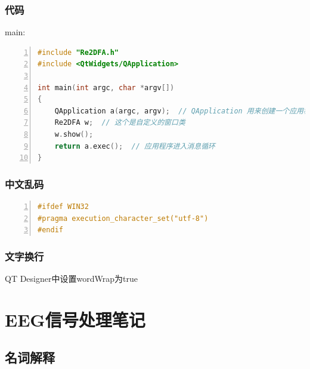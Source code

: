 \documentclass[cs4size,a4paper]{ctexart}
\numberwithin{equation}{section}
\numberwithin{table}{section}
\numberwithin{figure}{section}
\begin{document}

\subsubsection{代码}

main:

\begin{lstlisting}[language={c++},
    numbers=left,
    numberstyle=\tiny\monaco,
    basicstyle=\footnotesize\monaco]
#include "Re2DFA.h"
#include <QtWidgets/QApplication>

int main(int argc, char *argv[])
{
    QApplication a(argc, argv);  // QApplication 用来创建一个应用程序类，必须要有，且只能有一个
    Re2DFA w;  // 这个是自定义的窗口类
    w.show();
    return a.exec();  // 应用程序进入消息循环
}
\end{lstlisting}

\subsubsection{中文乱码}

\begin{lstlisting}[language={c++},
    numbers=left,
    numberstyle=\tiny\monaco,
    basicstyle=\footnotesize\monaco]
#ifdef WIN32  
#pragma execution_character_set("utf-8")  
#endif
\end{lstlisting}

\subsubsection{文字换行}

QT Designer中设置\colorbox{LetMeFlyGray}{wordWrap}为true

\section{EEG信号处理笔记}

\subsection{名词解释}
\end{document}
